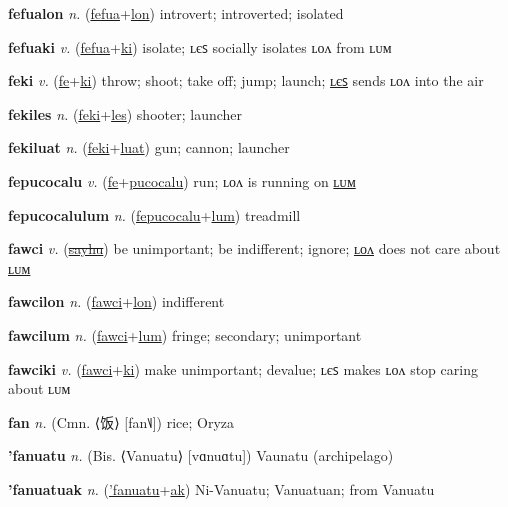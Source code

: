 \textbf{\hypertarget{fefualon}{fefualon}} \textit{n.} (\hyperlink{fefua}{fefua}+\allowbreak \hyperlink{lon}{lon})
introvert; introverted; isolated

\textbf{\hypertarget{fefuaki}{fefuaki}} \textit{v.} (\hyperlink{fefua}{fefua}+\allowbreak \hyperlink{ki}{ki})
isolate; ʟєꜱ socially isolates ʟᴏᴧ from ʟᴜᴍ

\textbf{\hypertarget{feki}{feki}} \textit{v.} (\hyperlink{fe}{fe}+\allowbreak \hyperlink{ki}{ki})
throw; shoot; take off; jump; launch; \hyperlink{fekiles}{ʟєꜱ} sends ʟᴏᴧ into the air

\textbf{\hypertarget{fekiles}{fekiles}} \textit{n.} (\hyperlink{feki}{feki}+\allowbreak \hyperlink{les}{les})
shooter; launcher

\textbf{\hypertarget{fekiluat}{fekiluat}} \textit{n.} (\hyperlink{feki}{feki}+\allowbreak \hyperlink{luat}{luat})
gun; cannon; launcher

\textbf{\hypertarget{fepucocalu}{fepucocalu}} \textit{v.} (\hyperlink{fe}{fe}+\allowbreak \hyperlink{pucocalu}{pucocalu})
run; ʟᴏᴧ is running on \hyperlink{fepucocalulum}{ʟᴜᴍ}

\textbf{\hypertarget{fepucocalulum}{fepucocalulum}} \textit{n.} (\hyperlink{fepucocalu}{fepucocalu}+\allowbreak \hyperlink{lum}{lum})
treadmill

\textbf{\hypertarget{fawci}{fawci}} \textit{v.} (\hyperlink{sayhu}{\sout{sayhu}})
be unimportant; be indifferent; ignore; \hyperlink{fawcilon}{ʟᴏᴧ} does not care about \hyperlink{fawcilum}{ʟᴜᴍ}

\textbf{\hypertarget{fawcilon}{fawcilon}} \textit{n.} (\hyperlink{fawci}{fawci}+\allowbreak \hyperlink{lon}{lon})
indifferent

\textbf{\hypertarget{fawcilum}{fawcilum}} \textit{n.} (\hyperlink{fawci}{fawci}+\allowbreak \hyperlink{lum}{lum})
fringe; secondary; unimportant

\textbf{\hypertarget{fawciki}{fawciki}} \textit{v.} (\hyperlink{fawci}{fawci}+\allowbreak \hyperlink{ki}{ki})
make unimportant; devalue; ʟєꜱ makes ʟᴏᴧ stop caring about ʟᴜᴍ

\textbf{\hypertarget{fan}{fan}} \textit{n.} (Cmn. ⟨{\chinese{}饭}⟩ [fan˥˩])
rice; Oryza

\textbf{\hypertarget{'fanuatu}{'fanuatu}} \textit{n.} (Bis. ⟨Vanuatu⟩ [vɑnuɑtu])
Vaunatu (archipelago)

\textbf{\hypertarget{'fanuatuak}{'fanuatuak}} \textit{n.} (\hyperlink{'fanuatu}{'fanuatu}+\allowbreak \hyperlink{ak}{ak})
Ni-Vanuatu; Vanuatuan; from Vanuatu

